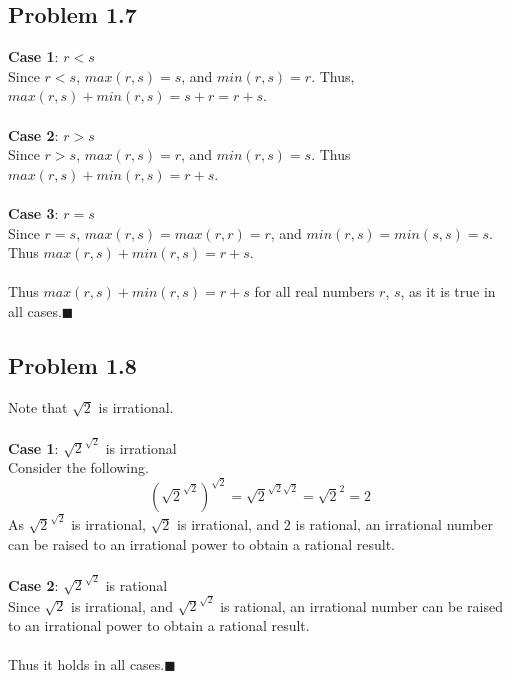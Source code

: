 \documentclass{article}
\begin{document}
\subsection{Problem 1.7}
\textbf{Case 1}: $r<s$\\
Since $r<s$, $max(r,s)=s$, and $min(r,s)=r$. Thus, $max(r,s)+min(r,s)=s+r=r+s$.\\
\\
\textbf{Case 2}: $r>s$\\
Since $r>s$, $max(r,s)=r$, and $min(r,s)=s$. Thus $max(r,s)+min(r,s)=r+s$.\\
\\
\textbf{Case 3}: $r=s$\\
Since $r=s$, $max(r,s)=max(r,r)=r$, and $min(r,s)=min(s,s)=s$. Thus $max(r,s)+min(r,s)=r+s$.\\
\\
Thus $max(r,s)+min(r,s)=r+s$ for all real numbers $r$, $s$, as it is true in all cases.\hfill$\blacksquare$
\subsection{Problem 1.8}
Note that $\sqrt{2}$ is irrational.\\
\\
\textbf{Case 1}: $\sqrt{2}^{\sqrt{2}}$ is irrational\\
Consider the following.
$$(\sqrt{2}^{\sqrt{2}})^{\sqrt{2}}=\sqrt{2}^{\sqrt{2}\sqrt{2}}=\sqrt{2}^2=2$$
As $\sqrt{2}^{\sqrt{2}}$ is irrational, $\sqrt{2}$ is irrational, and $2$ is rational, an irrational number can be raised to an irrational power to obtain a rational result.\\
\\
\textbf{Case 2}: $\sqrt{2}^{\sqrt{2}}$ is rational\\
Since $\sqrt{2}$ is irrational, and $\sqrt{2}^{\sqrt{2}}$ is rational, an irrational number can be raised to an irrational power to obtain a rational result.\\
\\
Thus it holds in all cases.\hfill$\blacksquare$
\end{document}
